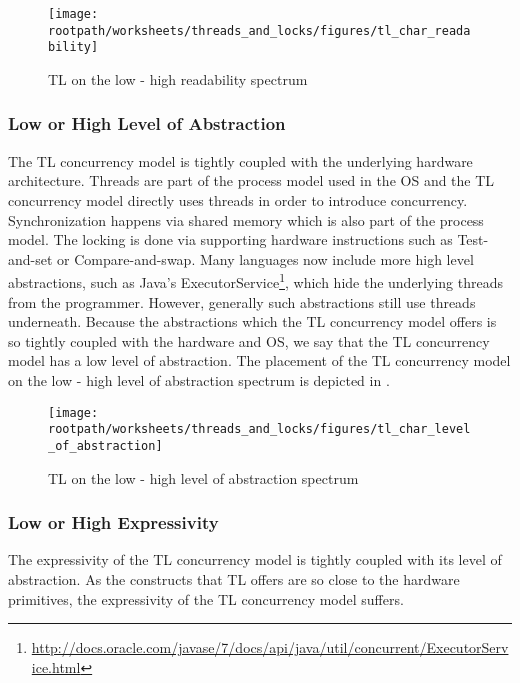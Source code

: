 \begin{figure}[htbp]
\centering
 \texttt{[image: \\rootpath/worksheets/threads\_and\_locks/figures/tl\_char\_readability]} 
 \caption{\ac{TL} on the low - high readability spectrum}
\label{fig:char_tl_readability}
\end{figure}

\subsubsection{Low or High Level of Abstraction}\label{sec:tl_level_of_abstraction}
The \ac{TL} concurrency model is tightly coupled with the underlying hardware architecture. Threads are part of the process model used in the \ac{OS} and the \ac{TL} concurrency model directly uses threads in order to introduce concurrency. Synchronization happens via shared memory which is also part of the process model. The locking is done via supporting hardware instructions such as Test-and-set or Compare-and-swap\cite[p. 1990]{scott2011sync}. Many languages now include more high level abstractions, such as Java's ExecutorService\footnote{\url{http://docs.oracle.com/javase/7/docs/api/java/util/concurrent/ExecutorService.html}}, which hide the underlying threads from the programmer. However, generally such abstractions still use threads underneath. Because the abstractions which the \ac{TL} concurrency model offers is so tightly coupled with the hardware and \ac{OS}, we say that the \ac{TL} concurrency model has a low level of abstraction. The placement of the \ac{TL} concurrency model on the low - high level of abstraction spectrum is depicted in .

\begin{figure}[htbp]
\centering
 \texttt{[image: \\rootpath/worksheets/threads\_and\_locks/figures/tl\_char\_level\_of\_abstraction]} 
 \caption{\ac{TL} on the low - high level of abstraction spectrum}
\label{fig:char_tl_level_of_abstraction}
\end{figure}

\subsubsection{Low or High Expressivity}\label{sec:tl_expressivity}
The expressivity of the \ac{TL} concurrency model is tightly coupled with its level of abstraction. As the constructs that \ac{TL} offers are so close to the hardware primitives, the expressivity of the \ac{TL} concurrency model suffers.

